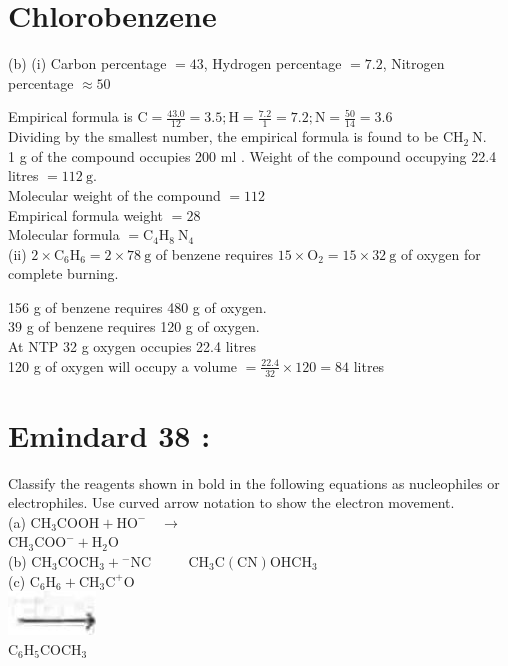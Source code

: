 \documentclass[10pt]{article}
\begin{document}
\section*{Chlorobenzene}
(b) (i) Carbon percentage $=43$, Hydrogen percentage $=7.2$, Nitrogen percentage $\approx 50$

Empirical formula is $\mathrm{C}=\frac{43.0}{12}=3.5 ; \mathrm{H}=\frac{7.2}{1}=7.2 ; \mathrm{N}=\frac{50}{14}=3.6$\\
Dividing by the smallest number, the empirical formula is found to be $\mathrm{CH}_{2} \mathrm{~N}$.\\
1 g of the compound occupies 200 ml . Weight of the compound occupying 22.4 litres $=112 \mathrm{~g}$.\\
Molecular weight of the compound $=112$\\
Empirical formula weight $=28$\\
Molecular formula $=\mathrm{C}_{4} \mathrm{H}_{8} \mathrm{~N}_{4}$\\
(ii) $2 \times \mathrm{C}_{6} \mathrm{H}_{6}=2 \times 78 \mathrm{~g}$ of benzene requires $15 \times \mathrm{O}_{2}=15 \times 32 \mathrm{~g}$ of oxygen for complete burning.

156 g of benzene requires 480 g of oxygen.\\
39 g of benzene requires 120 g of oxygen.\\
At NTP 32 g oxygen occupies 22.4 litres\\
120 g of oxygen will occupy a volume $=\frac{22.4}{32} \times 120=84$ litres

\section*{Emindard 38 :}
Classify the reagents shown in bold in the following equations as nucleophiles or electrophiles. Use curved arrow notation to show the electron movement.\\
(a) $\mathrm{CH}_{3} \mathrm{COOH}+\mathrm{HO}^{-} \quad \longrightarrow$\\
$\mathrm{CH}_{3} \mathrm{COO}^{-}+\mathrm{H}_{2} \mathrm{O}$\\
(b) $\mathrm{CH}_{3} \mathrm{COCH}_{3}+{ }^{-} \mathrm{NC}$ $\qquad$ $\mathrm{CH}_{3} \mathrm{C}(\mathrm{CN}) \mathrm{OHCH}_{3}$\\
(c) $\mathrm{C}_{6} \mathrm{H}_{6}+\mathrm{CH}_{3} \mathrm{C}^{+} \mathrm{O}$\\
\includegraphics[max width=\textwidth, center]{2025_01_28_8470952b98110cec3aabg-130}\\
$\mathrm{C}_{6} \mathrm{H}_{5} \mathrm{COCH}_{3}$
\end{document}
